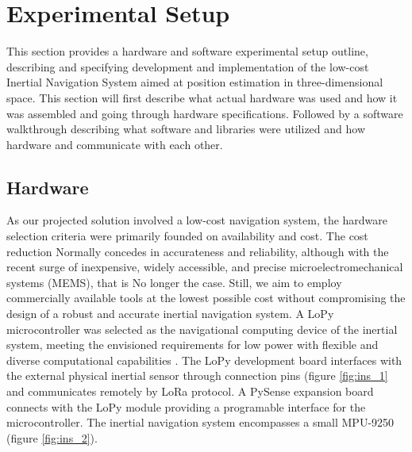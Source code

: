 \section{Experimental Setup}

This section provides a hardware and software experimental setup outline, describing and specifying development and implementation of the low-cost Inertial Navigation System aimed at position estimation in three-dimensional space. This section will first describe what actual hardware was used and how it was assembled and going through hardware specifications. Followed by a software walkthrough describing what software and libraries were utilized and how hardware and communicate with each other.

\subsection{Hardware}

As our projected solution involved a low-cost navigation system, the hardware selection criteria were primarily founded on availability and cost. The cost reduction Normally concedes in accurateness and reliability, although with the recent surge of inexpensive, widely accessible, and precise microelectromechanical systems (MEMS), that is No longer the case. Still, we aim to employ commercially available tools at the lowest possible cost without compromising the design of a robust and accurate inertial navigation system. A LoPy microcontroller was selected as the navigational computing device of the inertial system, meeting the envisioned requirements for low power with flexible and diverse computational capabilities \cite{lopy}. The LoPy development board interfaces with the external physical inertial sensor through connection pins (figure \ref{fig:ins_1} and communicates remotely by LoRa protocol. A PySense expansion board connects with the LoPy module providing a programable interface for the microcontroller. The inertial navigation system encompasses a small MPU-9250 (figure \ref{fig:ins_2}).

